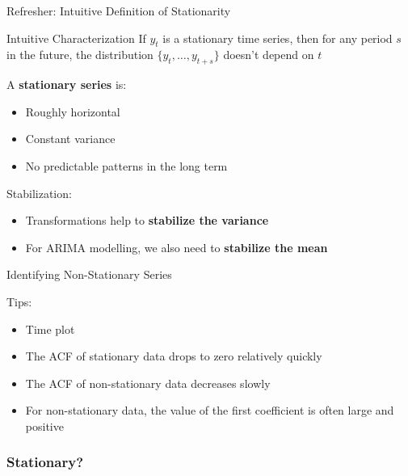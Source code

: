 \documentclass{beamer}
\begin{document}
\begin{frame}{Refresher: Intuitive Definition of Stationarity}

  \begin{block}{Intuitive Characterization}
    If ${y_t}$ is a stationary time series, then for any period $s$ in the future, the distribution $\{y_t, \dots, y_{t+s}\}$ doesn't depend on $t$
  \end{block}

  A \textbf{stationary series} is:
  \begin{itemize}
  \item Roughly horizontal
  \item Constant variance
  \item No predictable patterns in the long term
  \end{itemize}

  Stabilization: 
  \begin{itemize}
  \item Transformations help to \textbf{stabilize the variance}
  \item For ARIMA modelling, we also need to \textbf{stabilize the mean}
  \end{itemize}
  
\end{frame}


\begin{frame}{Identifying Non-Stationary Series}

  Tips:\\
  
  \begin{itemize}
  \item Time plot
  \item The ACF of stationary data drops to zero relatively quickly
  \item The ACF of non-stationary data decreases slowly
  \item For non-stationary data, the value of the first coefficient is often large and positive
  \end{itemize}

  
\end{frame}


\begin{frame}
  \frametitle{Stationary?}
\end{frame}
\end{document}
